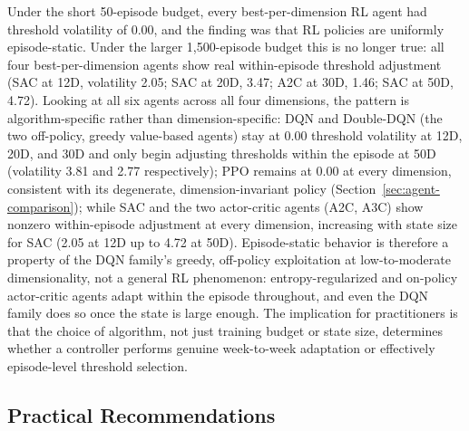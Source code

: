 \documentclass[preprint,review,authoryear,12pt]{elsarticle}
\begin{document}
Under the short 50-episode budget, every best-per-dimension RL agent had threshold
volatility of 0.00, and the finding was that RL policies are uniformly episode-static.
Under the larger 1{,}500-episode budget this is no longer true: all four
best-per-dimension agents show real within-episode threshold adjustment (SAC at 12D,
volatility 2.05; SAC at 20D, 3.47; A2C at 30D, 1.46; SAC at 50D, 4.72). Looking at all six
agents across all four dimensions, the pattern is algorithm-specific rather than
dimension-specific: DQN and Double-DQN (the two off-policy, greedy value-based agents)
stay at 0.00 threshold volatility at 12D, 20D, and 30D and only begin adjusting
thresholds within the episode at 50D (volatility 3.81 and 2.77 respectively); PPO remains
at 0.00 at every dimension, consistent with its degenerate, dimension-invariant policy
(Section~\ref{sec:agent-comparison}); while SAC and the two actor-critic agents (A2C,
A3C) show nonzero within-episode adjustment at every dimension, increasing with state
size for SAC (2.05 at 12D up to 4.72 at 50D). Episode-static
behavior is therefore a property of the DQN family's greedy, off-policy exploitation at
low-to-moderate dimensionality, not a general RL phenomenon: entropy-regularized and
on-policy actor-critic agents adapt within the episode throughout, and even the DQN family
does so once the state is large enough. The implication for practitioners is that the
choice of algorithm, not just training budget or state size, determines whether a
controller performs genuine week-to-week adaptation or effectively episode-level threshold
selection.

\subsection{Practical Recommendations}
\end{document}
